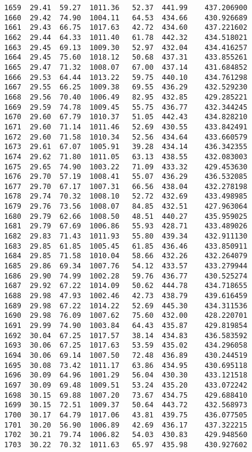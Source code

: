 \documentclass[11pt]{article}
\begin{document}
\begin{tcolorbox}[breakable, size=fbox, boxrule=.5pt, pad at break*=1mm, opacityfill=0]
\begin{Verbatim}[commandchars=\\\{\}]
1659  29.41  59.27  1011.36   52.37  441.99    437.206900
1660  29.42  74.90  1004.11   64.53  434.66    430.926689
1661  29.43  66.75  1017.63   42.72  434.60    437.221602
1662  29.44  64.33  1011.40   61.78  442.32    434.518021
1663  29.45  69.13  1009.30   52.97  432.04    434.416257
1664  29.45  75.60  1018.12   50.68  437.31    433.855261
1665  29.47  71.32  1008.07   67.00  437.14    431.684852
1666  29.53  64.44  1013.22   59.75  440.10    434.761298
1667  29.55  66.25  1009.38   69.55  436.29    432.529230
1668  29.56  70.40  1006.49   82.95  432.85    429.285221
1669  29.59  74.78  1009.45   55.75  436.77    432.344245
1670  29.60  67.79  1010.37   51.05  442.43    434.828210
1671  29.60  71.14  1011.46   52.69  430.55    433.842491
1672  29.60  71.58  1010.34   52.56  434.64    433.660579
1673  29.61  67.07  1005.91   39.28  434.14    436.342355
1674  29.62  71.80  1011.05   63.13  438.55    432.083003
1675  29.65  74.90  1003.22   71.09  433.32    429.453630
1676  29.70  57.19  1008.41   55.07  436.29    436.532085
1677  29.70  67.17  1007.31   66.56  438.04    432.278198
1678  29.74  70.32  1008.10   52.72  432.69    433.498985
1679  29.76  73.56  1008.07   84.85  432.51    427.963064
1680  29.79  62.66  1008.50   48.51  440.27    435.959025
1681  29.79  67.69  1006.86   55.93  428.71    433.489026
1682  29.83  71.43  1011.93   55.80  439.34    432.911130
1683  29.85  61.85  1005.45   61.85  436.46    433.850911
1684  29.85  71.58  1010.04   58.66  432.26    432.264079
1685  29.86  69.34  1007.76   54.12  433.57    433.279944
1686  29.90  74.99  1002.28   59.76  436.77    430.525274
1687  29.92  67.22  1014.09   50.62  444.78    434.718655
1688  29.98  47.93  1002.46   42.73  438.79    439.616459
1689  29.98  67.22  1014.22   52.69  445.30    434.311536
1690  29.98  76.09  1007.62   75.60  432.00    428.220701
1691  29.99  74.90  1003.84   64.43  435.87    429.819854
1692  30.04  67.25  1017.57   38.14  434.83    436.583592
1693  30.06  67.25  1017.63   53.59  435.02    434.296058
1694  30.06  69.14  1007.50   72.48  436.89    430.244519
1695  30.08  73.42  1011.17   63.86  434.95    430.695118
1696  30.09  64.96  1001.29   56.04  430.30    433.121518
1697  30.09  69.48  1009.51   53.24  435.20    433.072242
1698  30.15  69.88  1007.20   73.67  434.75    429.688410
1699  30.15  72.51  1009.37   50.64  443.72    432.568973
1700  30.17  64.79  1017.06   43.81  439.75    436.077505
1701  30.20  56.90  1006.89   42.69  436.17    437.322215
1702  30.21  79.74  1006.82   54.03  430.83    429.948560
1703  30.22  70.32  1011.63   65.97  435.98    430.927602

\end{Verbatim}
\end{tcolorbox}
\end{document}
